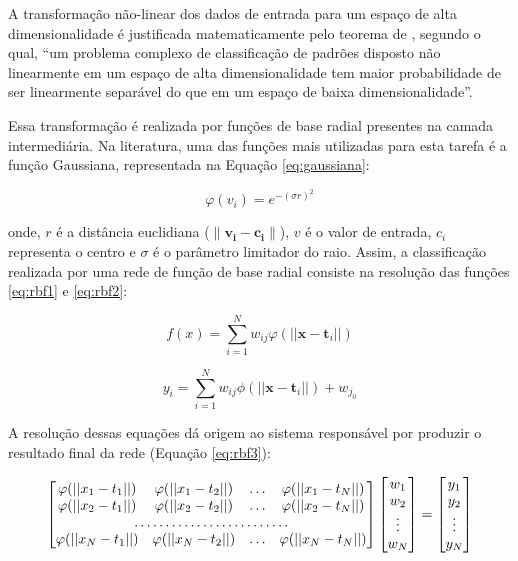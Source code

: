 \documentclass[qual, classic, a4paper]{ufbathesis}
\begin{document}
A transformação não-linear dos dados de entrada para um espaço de alta dimensionalidade é justificada matematicamente pelo teorema de , 
segundo o qual, ``um problema complexo de classificação de padrões disposto não linearmente em um espaço de alta dimensionalidade tem maior probabilidade de ser linearmente separável do que em um espaço de baixa dimensionalidade''.

Essa transformação é realizada por funções de base radial presentes na camada intermediária. 
Na literatura, uma das funções mais utilizadas para esta tarefa é a função Gaussiana, representada na Equação \ref{eq:gaussiana}:

\begin{equation}
    \label{eq:gaussiana}
    \varphi (v_{i})=e^{-(\sigma r)^{2}}
\end{equation}

onde, $r$ é a distância euclidiana ($\|\mathbf {v_{i}} - \mathbf {c_{i}}\|$), $v$ é o valor de entrada, $c_i$ representa o centro e $\sigma$ é o parâmetro limitador do raio.
Assim, a classificação realizada por uma rede de função de base radial consiste na resolução das funções \ref{eq:rbf1} e \ref{eq:rbf2}:

\begin{equation} \label{eq:rbf1}
    f(x)=\sum _{{i=1}}^{N}w_{ij}\varphi (||{\mathbf  {x}}-{\mathbf  {t}}_{i}||)
\end{equation}

\begin{equation} \label{eq:rbf2}
    y_i=\sum _{{i=1}}^{N}w_{ij}\phi (||{\mathbf  {x}}-{\mathbf  {t}}_{i}||) + w_{j_0}
\end{equation}

A resolução dessas equações dá origem ao sistema responsável por produzir o resultado final da rede (Equação \ref{eq:rbf3}):

\begin{equation} \label{eq:rbf3}
\begin{bmatrix}
    \varphi (||{{x_1}}-{{t}}_{1}||) & \varphi (||{{x_1}}-{{t}}_{2}||) & \dots & \varphi (||{{x_1}}-{{t}}_{N}||) \\
    \varphi (||{{x_2}}-{{t}}_{1}||) & \varphi (||{{x_2}}-{{t}}_{2}||) & \dots & \varphi (||{{x_2}}-{{t}}_{N}||) \\
    \hdotsfor{5} \\
    \varphi (||{{x_N}}-{{t}}_{1}||) & \varphi (||{{x_N}}-{{t}}_{2}||) & \dots & \varphi (||{{x_N}}-{{t}}_{N}||)
\end{bmatrix}
\begin{bmatrix}
    w_1 \\
    w_2 \\
    \vdots \\
    w_N \\
\end{bmatrix}
=
\begin{bmatrix}
    y_1 \\
    y_2 \\
    \vdots \\
    y_N \\
\end{bmatrix}
\end{equation}
\end{document}
